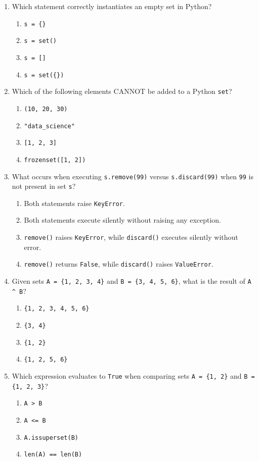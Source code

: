 \documentclass[11pt,a4paper]{article}
\begin{document}
\begin{enumerate}[label=\textbf{Q\arabic*.},leftmargin=2em,itemsep=1.5pt,topsep=1pt]
\item Which statement correctly instantiates an empty set in Python?
\begin{enumerate}[label=\Alph*.,leftmargin=2em]
\item \texttt{s = \{\}} \item \texttt{s = set()} \item \texttt{s = []} \item \texttt{s = set(\{\})}
\end{enumerate}
\item Which of the following elements CANNOT be added to a Python \texttt{set}?
\begin{enumerate}[label=\Alph*.,leftmargin=2em]
\item \texttt{(10, 20, 30)}
\item \texttt{"data\_science"}
\item \texttt{[1, 2, 3]}
\item \texttt{frozenset([1, 2])}
\end{enumerate}
\item What occurs when executing \texttt{s.remove(99)} versus \texttt{s.discard(99)} when \texttt{99} is not present in set \texttt{s}?
\begin{enumerate}[label=\Alph*.,leftmargin=2em]
\item Both statements raise \texttt{KeyError}.
\item Both statements execute silently without raising any exception.
\item \texttt{remove()} raises \texttt{KeyError}, while \texttt{discard()} executes silently without error.
\item \texttt{remove()} returns \texttt{False}, while \texttt{discard()} raises \texttt{ValueError}.
\end{enumerate}
\item Given sets \texttt{A = \{1, 2, 3, 4\}} and \texttt{B = \{3, 4, 5, 6\}}, what is the result of \texttt{A \textasciicircum\ B}?
\begin{enumerate}[label=\Alph*.,leftmargin=2em]
\item \texttt{\{1, 2, 3, 4, 5, 6\}}
\item \texttt{\{3, 4\}}
\item \texttt{\{1, 2\}}
\item \texttt{\{1, 2, 5, 6\}}
\end{enumerate}
\item Which expression evaluates to \texttt{True} when comparing sets \texttt{A = \{1, 2\}} and \texttt{B = \{1, 2, 3\}}?
\begin{enumerate}[label=\Alph*.,leftmargin=2em]
\item \texttt{A > B}
\item \texttt{A <= B}
\item \texttt{A.issuperset(B)}
\item \texttt{len(A) == len(B)}
\end{enumerate}
\end{enumerate}
\end{document}
